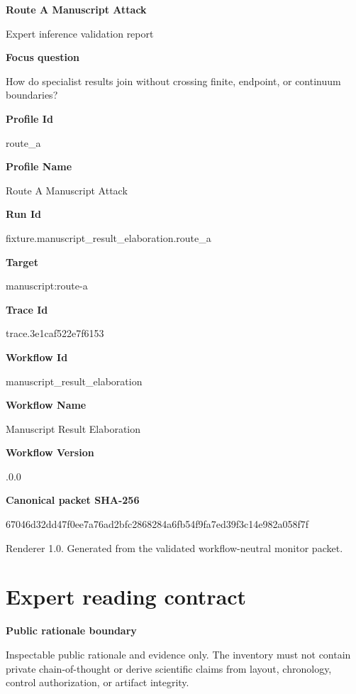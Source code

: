\documentclass[10pt,a4paper]{article}
\newcommand{\TraceField}[2]{\par\noindent\textbf{#1}\par\noindent #2\par\smallskip}
\begin{document}
\hypersetup{pageanchor=false}
\begin{titlepage}
\centering
{\LARGE\bfseries Route A Manuscript\allowbreak{} Attack\par}
\vspace{1em}
{\large Expert inference validation report\par}
\vspace{2em}
\begin{minipage}{0.92\linewidth}
\TraceField{Focus question}{How do specialist\allowbreak{} results join without crossing finite, endpoint, or continuum boundaries\allowbreak{}?}

\TraceField{Profile Id}{route\_\allowbreak{}a}

\TraceField{Profile Name}{Route A Manuscript\allowbreak{} Attack}

\TraceField{Run Id}{fixture.\allowbreak{}manuscript\allowbreak{}\_\allowbreak{}result\_\allowbreak{}elaboratio\allowbreak{}n.\allowbreak{}route\_\allowbreak{}a}

\TraceField{Target}{manuscript\allowbreak{}:\allowbreak{}route-\allowbreak{}a}

\TraceField{Trace Id}{trace.\allowbreak{}3e1caf522e\allowbreak{}7f6153}

\TraceField{Workflow Id}{manuscript\allowbreak{}\_\allowbreak{}result\_\allowbreak{}elaboratio\allowbreak{}n}

\TraceField{Workflow Name}{Manuscript\allowbreak{} Result Elaboratio\allowbreak{}n}

\TraceField{Workflow Version}{1.\allowbreak{}0.\allowbreak{}0}

\TraceField{Canonical packet SHA-256}{67046d32dd\allowbreak{}47f0ee7a76\allowbreak{}ad2bfc2868\allowbreak{}284a6fb54f\allowbreak{}9fa7ed39f3\allowbreak{}c14e982a05\allowbreak{}8f7f}

\end{minipage}
\vfill
{\small Renderer 1.0. Generated from the validated workflow-neutral monitor packet.}
\end{titlepage}
\tableofcontents\clearpage
\hypersetup{pageanchor=true}
\section{Expert reading contract}\label{sec-reading-contract}
\TraceField{Public rationale boundary}{Inspectabl\allowbreak{}e public rationale and evidence only.\allowbreak{} The inventory must not contain private chain-\allowbreak{}of-\allowbreak{}thought or derive scientific\allowbreak{} claims from layout, chronology\allowbreak{}, control authorizat\allowbreak{}ion, or artifact integrity.\allowbreak{}}
\end{document}
